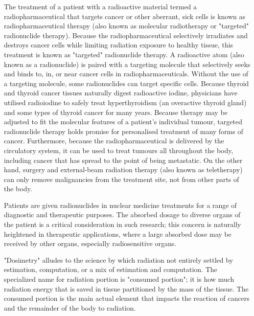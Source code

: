 \documentclass[12pt]{article}
\begin{document}
The treatment of a patient with a radioactive material termed a radiopharmaceutical that targets cancer or other aberrant, sick cells is known as radiopharmaceutical therapy (also known as molecular radiotherapy or "targeted" radionuclide therapy). Because the radiopharmaceutical selectively irradiates and destroys cancer cells while limiting radiation exposure to healthy tissue, this treatment is known as "targeted" radionuclide therapy. A radioactive atom (also known as a radionuclide) is paired with a targeting molecule that selectively seeks and binds to, in, or near cancer cells in radiopharmaceuticals. Without the use of a targeting molecule, some radionuclides can target specific cells. Because thyroid and thyroid cancer tissues naturally digest radioactive iodine, physicians have utilised radioiodine to safely treat hyperthyroidism (an overactive thyroid gland) and some types of thyroid cancer for many years. Because therapy may be adjusted to fit the molecular features of a patient's individual tumour, targeted radionuclide therapy holds promise for personalised treatment of many forms of cancer. Furthermore, because the radiopharmaceutical is delivered by the circulatory system, it can be used to treat tumours all throughout the body, including cancer that has spread to the point of being metastatic. On the other hand, surgery and external-beam radiation therapy (also known as teletherapy) can only remove malignancies from the treatment site, not from other parts of the body.
\par
Patients are given radionuclides in nuclear medicine treatments for a range of diagnostic and therapeutic purposes. The absorbed dosage to diverse organs of the patient is a critical consideration in such research; this concern is naturally heightened in therapeutic applications, where a large absorbed dose may be received by other organs, especially radiosensitive organs. 
\par
"Dosimetry" alludes to the science by which radiation not entirely settled by estimation, computation, or a mix of estimation and computation. The specialized name for radiation portion is "consumed portion"; it is how much radiation energy that is saved in tissue partitioned by the mass of the tissue. The consumed portion is the main actual element that impacts the reaction of cancers and the remainder of the body to radiation.
\par
\end{document}
